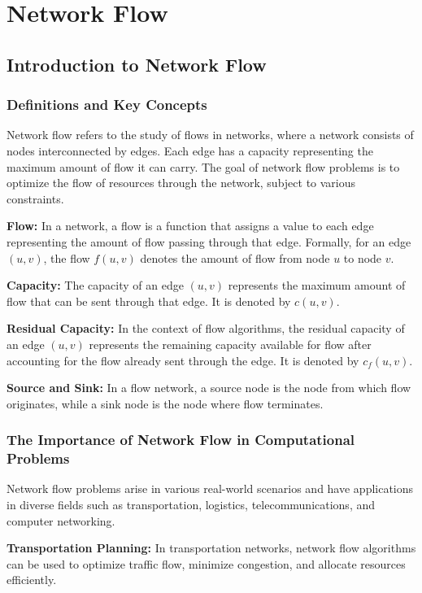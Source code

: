 \documentclass[12pt]{book} %
\begin{document}
\chapter{Network Flow}

\section{Introduction to Network Flow}

\subsection{Definitions and Key Concepts}

Network flow refers to the study of flows in networks, where a network consists of nodes interconnected by edges. Each edge has a capacity representing the maximum amount of flow it can carry. The goal of network flow problems is to optimize the flow of resources through the network, subject to various constraints.

\textbf{Flow:} In a network, a flow is a function that assigns a value to each edge representing the amount of flow passing through that edge. Formally, for an edge \( (u, v) \), the flow \( f(u, v) \) denotes the amount of flow from node \( u \) to node \( v \).

\textbf{Capacity:} The capacity of an edge \( (u, v) \) represents the maximum amount of flow that can be sent through that edge. It is denoted by \( c(u, v) \).

\textbf{Residual Capacity:} In the context of flow algorithms, the residual capacity of an edge \( (u, v) \) represents the remaining capacity available for flow after accounting for the flow already sent through the edge. It is denoted by \( c_f(u, v) \).

\textbf{Source and Sink:} In a flow network, a source node is the node from which flow originates, while a sink node is the node where flow terminates.

\subsection{The Importance of Network Flow in Computational Problems}

Network flow problems arise in various real-world scenarios and have applications in diverse fields such as transportation, logistics, telecommunications, and computer networking.

\textbf{Transportation Planning:} In transportation networks, network flow algorithms can be used to optimize traffic flow, minimize congestion, and allocate resources efficiently.
\end{document}

